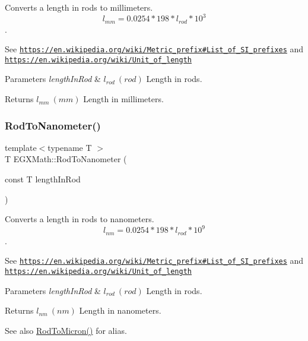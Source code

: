 Converts a length in rods to millimeters. \[ l_{mm}=0.0254 * 198 * l_{rod} * 10^{3} \]. 

See \href{https://en.wikipedia.org/wiki/Metric_prefix#List_of_SI_prefixes}{\tt https\+://en.\+wikipedia.\+org/wiki/\+Metric\+\_\+prefix\#\+List\+\_\+of\+\_\+\+S\+I\+\_\+prefixes} and \href{https://en.wikipedia.org/wiki/Unit_of_length}{\tt https\+://en.\+wikipedia.\+org/wiki/\+Unit\+\_\+of\+\_\+length} 
\begin{DoxyParams}{Parameters}
{\em length\+In\+Rod} & $ l_{rod}\ (rod)$ Length in rods. \\
\hline
\end{DoxyParams}
\begin{DoxyReturn}{Returns}
$ l_{mm}\ (mm)$ Length in millimeters. 
\end{DoxyReturn}
\mbox{\label{group___e_g_x_math-_conversions-_length_conversions-_imperial-_rod-_s_i_gaa41557dd8cc5aa5ff83312665e8a4331}} 
\subsubsection{\texorpdfstring{Rod\+To\+Nanometer()}{RodToNanometer()}}
{\footnotesize\ttfamily template$<$typename T $>$ \\
T E\+G\+X\+Math\+::\+Rod\+To\+Nanometer (\begin{DoxyParamCaption}\item[{const T}]{length\+In\+Rod }\end{DoxyParamCaption})}



Converts a length in rods to nanometers. \[ l_{nm}=0.0254 * 198 * l_{rod} * 10^{9} \]. 

See \href{https://en.wikipedia.org/wiki/Metric_prefix#List_of_SI_prefixes}{\tt https\+://en.\+wikipedia.\+org/wiki/\+Metric\+\_\+prefix\#\+List\+\_\+of\+\_\+\+S\+I\+\_\+prefixes} and \href{https://en.wikipedia.org/wiki/Unit_of_length}{\tt https\+://en.\+wikipedia.\+org/wiki/\+Unit\+\_\+of\+\_\+length} 
\begin{DoxyParams}{Parameters}
{\em length\+In\+Rod} & $ l_{rod}\ (rod)$ Length in rods. \\
\hline
\end{DoxyParams}
\begin{DoxyReturn}{Returns}
$ l_{nm}\ (nm)$ Length in nanometers. 
\end{DoxyReturn}
\begin{DoxySeeAlso}{See also}
\mbox{\hyperlink{group___e_g_x_math-_conversions-_length_conversions-_imperial-_rod-_non-_s_i_ga91daf7bb89d486f6c8523a5436e5599d}{Rod\+To\+Micron()}} for alias. 
\end{DoxySeeAlso}
\mbox{\label{group___e_g_x_math-_conversions-_length_conversions-_imperial-_rod-_s_i_ga058c851a5a43a832b21eb2b077683b17}} 
